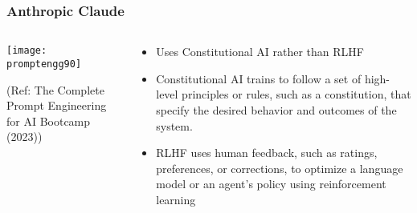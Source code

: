 \begin{frame}[fragile]\frametitle{Anthropic Claude}


\begin{columns}
    \begin{column}[T]{0.6\linewidth}
		\begin{center}
		\texttt{[image: promptengg90]}

		{\tiny (Ref: The Complete Prompt Engineering for AI Bootcamp (2023))}
		\end{center}	
    \end{column}
    \begin{column}[T]{0.4\linewidth}
	
	    \begin{itemize}
        \item 
		Uses Constitutional AI rather than RLHF
		\item Constitutional AI trains to follow a set of high-level principles or rules, such as a constitution, that specify the desired behavior and outcomes of the system.
		\item RLHF uses human feedback, such as ratings, preferences, or corrections, to optimize a language model or an agent’s policy using reinforcement learning
	    \end{itemize}
		
    \end{column}
  \end{columns}
\end{frame}

    

